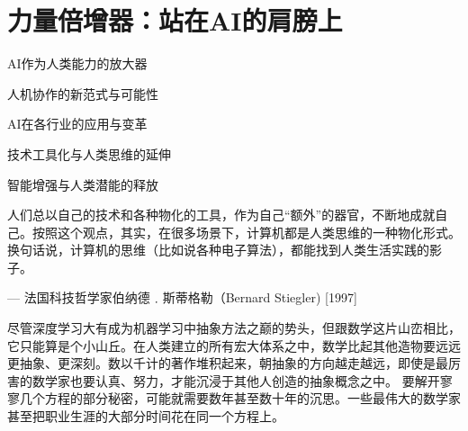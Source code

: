 \chapter{力量倍增器：站在AI的肩膀上}
 \begin{introduction}
  \item AI作为人类能力的放大器
  \item 人机协作的新范式与可能性
  \item AI在各行业的应用与变革
  \item 技术工具化与人类思维的延伸
  \item 智能增强与人类潜能的释放
\end{introduction}
人们总以自己的技术和各种物化的工具，作为自己“额外”的器官，不断地成就自己。按照这个观点，其实，在很多场景下，计算机都是人类思维的一种物化形式。换句话说，计算机的思维（比如说各种电子算法），都能找到人类生活实践的影子。
\begin{flushright}
— 法国科技哲学家伯纳德﹒斯蒂格勒（Bernard Stiegler)  [1997]
\end{flushright}
尽管深度学习大有成为机器学习中抽象方法之巅的势头，但跟数学这片山峦相比，它只能算是个小山丘。在人类建立的所有宏大体系之中，数学比起其他造物要远远更抽象、更深刻。数以千计的著作堆积起来，朝抽象的方向越走越远，即使是最厉害的数学家也要认真、努力，才能沉浸于其他人创造的抽象概念之中。
要解开寥寥几个方程的部分秘密，可能就需要数年甚至数十年的沉思。一些最伟大的数学家甚至把职业生涯的大部分时间花在同一个方程上。
